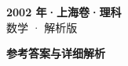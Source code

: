 \documentclass[zihao=-4, a4paper]{ctexart}
\begin{document}
\begin{center}
  {\Large\bfseries 2002 年·上海卷·理科}\\[4pt]
  {\large 数学 · 解析版}
\end{center}
\medskip
{}

\clearpage
{}
\begin{center}{\Large\bfseries 参考答案与详细解析}\end{center}
\medskip

\end{document}
